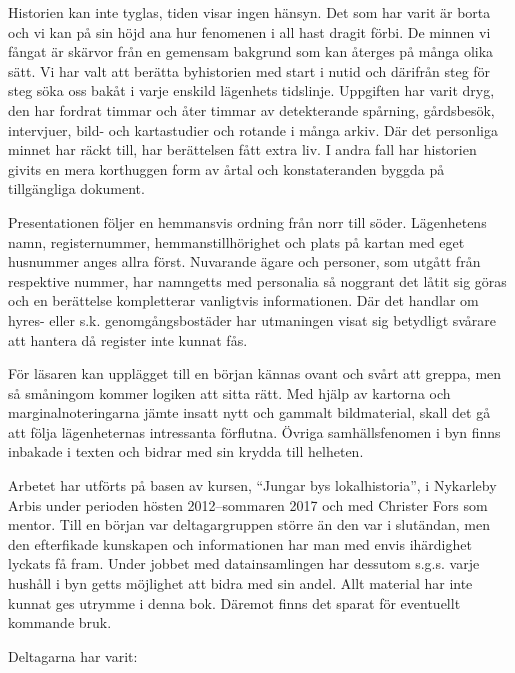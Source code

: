 

Historien kan inte tyglas, tiden visar ingen hänsyn. Det som har varit är borta och vi kan på sin höjd ana hur fenomenen i all hast dragit förbi. De minnen vi fångat är skärvor från en gemensam bakgrund som kan återges på många olika sätt. Vi har valt att berätta byhistorien med start i nutid och därifrån steg för steg söka oss bakåt i varje enskild lägenhets tidslinje. Uppgiften har varit dryg, den har fordrat timmar och åter timmar av detekterande spårning, gårdsbesök, intervjuer, bild- och kartastudier och rotande i många arkiv. Där det personliga minnet har räckt till, har berättelsen fått extra liv. I andra fall har historien givits en mera korthuggen form av årtal och konstateranden byggda på tillgängliga dokument.

Presentationen följer en hemmansvis ordning från norr till söder. Lägenhetens namn, registernummer, hemmanstillhörighet och plats på kartan med eget husnummer anges allra först. Nuvarande ägare och personer, som utgått från respektive nummer, har namngetts med personalia så noggrant det låtit sig göras och en berättelse kompletterar vanligtvis informationen. Där det handlar om hyres- eller s.k. genomgångsbostäder har utmaningen visat sig betydligt svårare att hantera då register inte kunnat fås.

För läsaren kan upplägget till en början kännas ovant och svårt att greppa, men så småningom kommer logiken att sitta rätt. Med hjälp av kartorna och marginalnoteringarna jämte insatt nytt och gammalt bildmaterial, skall det gå att följa lägenheternas intressanta förflutna. Övriga samhällsfenomen i byn finns inbakade i texten och bidrar med sin krydda till helheten.

Arbetet har utförts på basen av kursen, ``Jungar bys lokalhistoria'', i Nykarleby Arbis under perioden hösten 2012--sommaren 2017 och med Christer Fors som mentor. Till en början var deltagargruppen större än den var i slutändan, men den efterfikade kunskapen och informationen har man med envis ihärdighet lyckats få fram. Under jobbet med datainsamlingen har dessutom s.g.s. varje hushåll i byn getts möjlighet att bidra med sin andel. Allt material har inte kunnat ges utrymme i denna bok. Däremot finns det sparat för eventuellt kommande bruk.

Deltagarna har varit:

